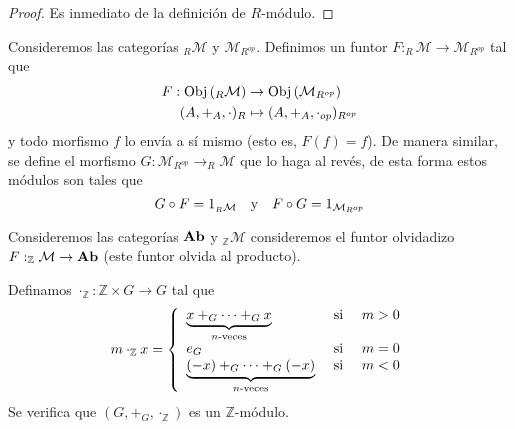 \documentclass[12pt]{report}
\theoremstyle{largebreak}
\newcommand\cf[3]{\ensuremath{#1:#2\rightarrow#3}}
\newcommand{\Obj}[1]{\ensuremath{\textup{Obj}\left(#1\right)}}
\newcommand{\Cat}[1]{\ensuremath{\textup{\textbf{#1}}}}
\begin{document}
    \begin{proof}
        Es inmediato de la definición de $R$-módulo.
    \end{proof}

    \begin{exa}
        Consideremos las categorías $_R\mathcal{M}$ y $\mathcal{M}_{R^{op}}$. Definimos un funtor $\cf{F}{_R\mathcal{M}}{\mathcal{M}_{R^{op}}}$ tal que
        \begin{equation*}
            \begin{split}
                F:\Obj{_R\mathcal{M}}&\rightarrow\Obj{\mathcal{M}_{R^{op}}}\\
                (A,+_A,\cdot)_R&\mapsto(A,+_A,\cdot_{op})_{R^{op}}\\
            \end{split}
        \end{equation*}
        y todo morfismo $f$ lo envía a sí mismo (esto es, $F(f)=f$). De manera similar, se define el morfismo $\cf{G}{\mathcal{M}_{R^{op}}}{_R\mathcal{M}}$ que lo haga al revés, de esta forma estos módulos son tales que
        \begin{equation*}
            G\circ F=1_{_R\mathcal{M}}\quad\textup{y}\quad F\circ G=1_{\mathcal{M}_{R^{op}}}
        \end{equation*}
    \end{exa}

    \begin{exa}
        Consideremos las categorías $\Cat{Ab}$ y $_{\mathbb{Z}}\mathcal{M}$ consideremos el funtor olvidadizo $\cf{F}{_{\mathbb{Z}}\mathcal{M}}{\Cat{Ab}}$ (este funtor olvida al producto).

        Definamos $\cf{\cdot_{\mathbb{Z}}}{\mathbb{Z}\times G}{G}$ tal que
        \begin{equation*}
            m\cdot_{\mathbb{Z}}x=\left\{
                \begin{array}{lcr}
                    \underbrace{x+_G\cdots+_Gx}_{n\textup{-veces}} & \textup{ si } & m>0\\
                    e_G & \textup{ si } & m=0\\
                    \underbrace{(-x)+_G\cdots+_G(-x)}_{n\textup{-veces}} & \textup{ si } & m<0\\
                \end{array}
            \right.
        \end{equation*}
        Se verifica que $(G,+_G,\cdot_{\mathbb{Z}})$ es un $\mathbb{Z}$-módulo.
    \end{exa}
\end{document}

